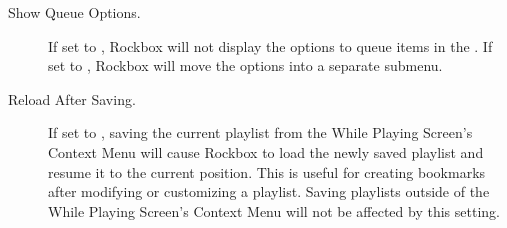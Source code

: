 \begin{description}
\begin{description}
  \item[Show Queue Options.]
  If set to , Rockbox will not display the options to queue items in
  the .
  If set to , Rockbox will move the options into a
  separate submenu.

  \item[Reload After Saving.]
  If set to , saving the current playlist from the While Playing Screen's
  Context Menu will cause Rockbox to load the newly saved playlist and resume it to the
  current position. This is useful for creating bookmarks after modifying or customizing
  a playlist. Saving playlists outside of the While Playing Screen's Context Menu will
  not be affected by this setting.

  \end{description}

\end{description}
